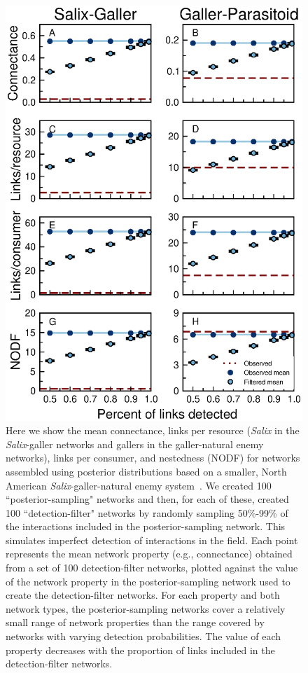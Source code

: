 \documentclass[12pt]{article}
\begin{document}
      \begin{figure}[ht]
      \caption{Here we show the mean connectance, links per resource (\emph{Salix} in the \emph{Salix}-galler networks and gallers in the galler-natural enemy networks), links per consumer, and nestedness (NODF) for networks assembled using posterior distributions based on a smaller, North American \emph{Salix}-galler-natural enemy system~\citep{Barbour2016,Barbour2016Dryad}. We created 100 ``posterior-sampling" networks and then, for each of these, created 100 ``detection-filter" networks by randomly sampling 50\%-99\% of the interactions included in the posterior-sampling network. This simulates imperfect detection of interactions in the field. Each point represents the mean network property (e.g., connectance) obtained from a set of 100 detection-filter networks, plotted against the value of the network property in the posterior-sampling network used to create the detection-filter networks. For each property and both network types, the posterior-sampling networks cover a relatively small range of network properties than the range covered by networks with varying detection probabilities. The value of each property decreases with the proportion of links included in the detection-filter networks.}
      \label{posterior_webs}    
      \begin{center}
      \includegraphics[width=.6\textwidth]{Figures/Salix_Galler_posterior_properties.eps}
      \end{center}
      \end{figure}

  \clearpage

     
    
\end{document}
